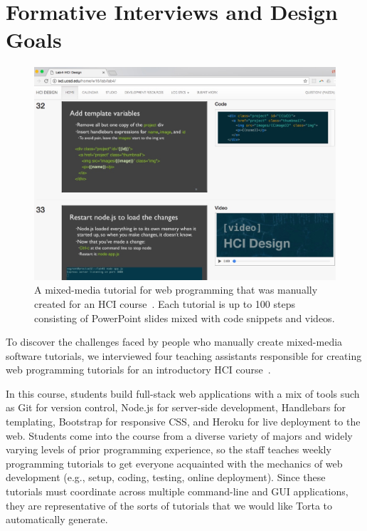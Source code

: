 \section{Formative Interviews and Design Goals}

\begin{figure}[h!]
\includegraphics[width=\columnwidth]{figures/torta/ixd-lab-slides.jpg}

\caption{A mixed-media tutorial for web programming that was manually
created for an HCI course~{\protect \cite{ixd}}. Each tutorial is up to
100 steps consisting of PowerPoint slides mixed with code snippets and
videos.}

\vspace{-1em} %

\label{fig:ixd-lab-slides}
\end{figure}

To discover the challenges faced by people who manually create
mixed-media software tutorials, we interviewed four teaching
assistants responsible for creating web programming tutorials for an
introductory HCI course~\cite{ixd}.


In this course, students build full-stack web applications with a mix of
tools such as Git for version control, Node.js for server-side
development, Handlebars for templating, Bootstrap for responsive CSS,
and Heroku for live deployment to the web. Students come into the course
from a diverse variety of majors and widely varying levels of prior programming
experience, so the staff teaches weekly programming tutorials to get
everyone acquainted with the mechanics of web development (e.g., setup,
coding, testing, online deployment). Since these tutorials must
coordinate across multiple command-line and GUI applications, they are
representative of the sorts of tutorials that we would like Torta to
automatically generate.

